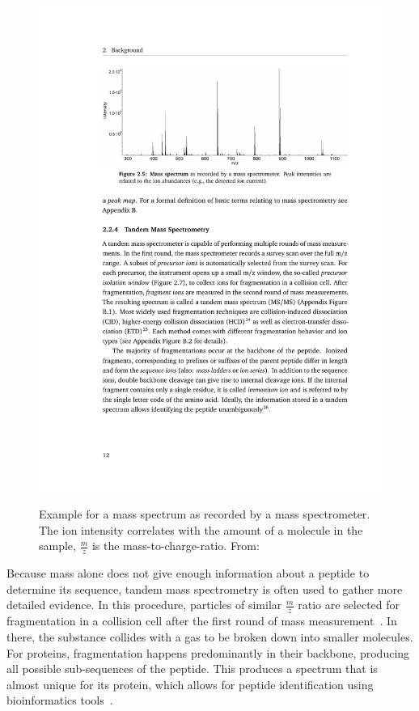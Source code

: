 	{
	\renewcommand{\baselinestretch}{0.9} 
	\normalsize
	\begin{figure}
		\centering
		\includegraphics[width = \textwidth, trim=3.9cm 20cm 2.5cm 3cm,clip]{figures/Grafik_Timo.pdf}
		\label{fig:mass_spectrum}
		\caption[Example for a mass spectrum]{Example for a mass spectrum as recorded by a mass spectrometer. The ion intensity correlates with the amount of a molecule in the sample, $\frac{m}{z}$ is the mass-to-charge-ratio. From:~\citet{Sachsenberg2017}}
	\end{figure}
	}
	Because mass alone does not give enough information about a peptide to determine its sequence, tandem mass spectrometry is often used to gather more detailed evidence. In this procedure, particles of similar $\frac{m}{z}$ ratio are selected for fragmentation in a collision cell after the first round of mass measurement~\cite{Sachsenberg2017}. In there, the substance collides with a gas to be broken down into smaller molecules. For proteins, fragmentation happens predominantly in their backbone, producing all possible sub-sequences of the peptide. This produces a spectrum that is almost unique for its protein, which allows for peptide identification using bioinformatics tools~\cite{Angel2012}.\\
